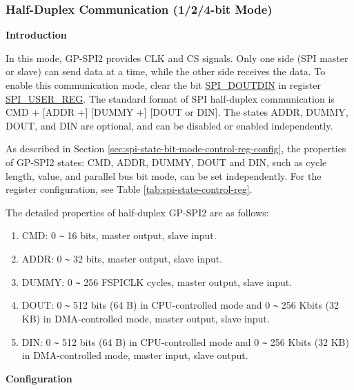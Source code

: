 \documentclass[main\_\_EN.tex]{subfiles}
\begin{document}
\subsubsection{Half-Duplex Communication (1/2/4-bit Mode)}
\label{para:spi-half-duplex-comm}

\textbf{Introduction}

In this mode, GP-SPI2 provides CLK and CS signals. Only one side (SPI master or slave) can send data at a time, while the other side receives the data. To enable this communication mode, clear the bit \hyperref[fielddesc:SPIDOUTDIN]{SPI\_DOUTDIN} in register \hyperref[regdesc:SPIUSERREG]{SPI\_USER\_REG}. The standard format of SPI half-duplex communication is CMD + [ADDR +] [DUMMY +] [DOUT or DIN]. The states ADDR, DUMMY, DOUT, and DIN are optional, and can be disabled or enabled independently.

As described in Section \ref{sec:spi-state-bit-mode-control-reg-config}, the properties of GP-SPI2 states: CMD, ADDR, DUMMY, DOUT and DIN, such as cycle length, value, and parallel bus bit mode, can be set independently. For the register configuration, see Table \ref{tab:spi-state-control-reg}.

The detailed properties of half-duplex GP-SPI2 are as follows:

\begin{enumerate}
    \item CMD: 0 \verb+~+ 16 bits, master output, slave input.
    \item ADDR: 0 \verb+~+ 32 bits, master output, slave input.
    \item DUMMY: 0 \verb+~+ 256 FSPICLK cycles, master output, slave input.
    \item DOUT: 0 \verb+~+ 512 bits (64 B) in CPU-controlled mode and 0 \verb+~+ 256 Kbits (32 KB) in DMA-controlled mode, master output, slave input.

    \item DIN: 0 \verb+~+ 512 bits (64 B) in CPU-controlled mode and 0 \verb+~+ 256 Kbits (32 KB) in DMA-controlled mode, master input, slave output.
\end{enumerate}

\textbf{Configuration}
\end{document}

